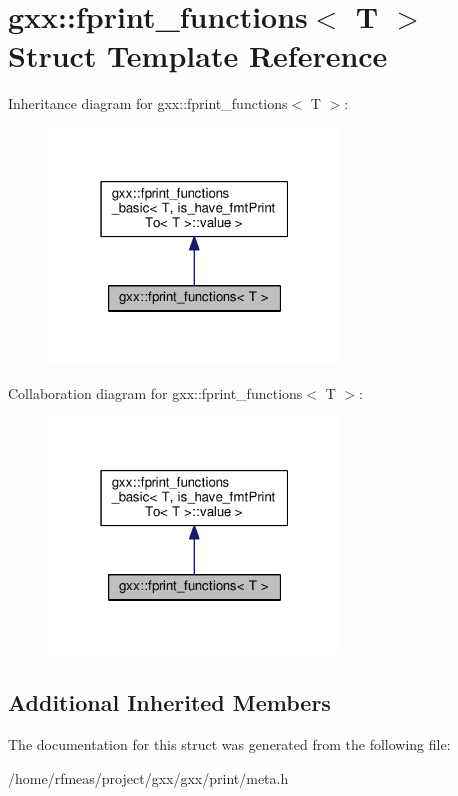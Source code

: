 \hypertarget{structgxx_1_1fprint__functions}{}\section{gxx\+:\+:fprint\+\_\+functions$<$ T $>$ Struct Template Reference}
\label{structgxx_1_1fprint__functions}


Inheritance diagram for gxx\+:\+:fprint\+\_\+functions$<$ T $>$\+:
\nopagebreak
\begin{figure}[H]
\begin{center}
\leavevmode
\includegraphics[width=220pt]{structgxx_1_1fprint__functions__inherit__graph}
\end{center}
\end{figure}


Collaboration diagram for gxx\+:\+:fprint\+\_\+functions$<$ T $>$\+:
\nopagebreak
\begin{figure}[H]
\begin{center}
\leavevmode
\includegraphics[width=220pt]{structgxx_1_1fprint__functions__coll__graph}
\end{center}
\end{figure}
\subsection*{Additional Inherited Members}


The documentation for this struct was generated from the following file\+:\begin{DoxyCompactItemize}
\item 
/home/rfmeas/project/gxx/gxx/print/meta.\+h\end{DoxyCompactItemize}

